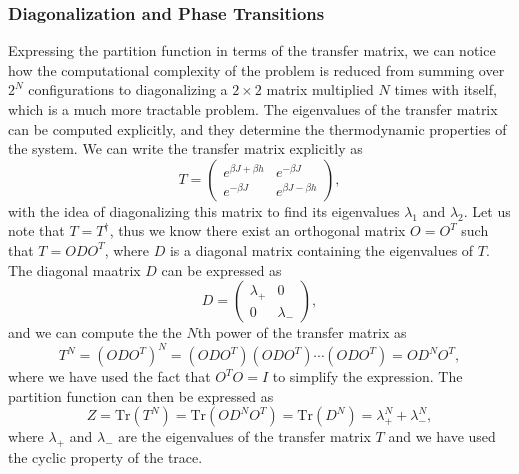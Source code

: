 \subsubsection{Diagonalization and Phase Transitions}

Expressing the partition function in terms of the transfer matrix, we can notice how the computational complexity of the problem is reduced from summing over \(2^N\) configurations to diagonalizing a \(2 \times 2\) matrix multiplied \(N\) times with itself, which is a much more tractable problem. The eigenvalues of the transfer matrix can be computed explicitly, and they determine the thermodynamic properties of the system. We can write the transfer matrix explicitly as
\[
    T = \begin{pmatrix}
        e^{\beta J + \beta h} & e^{-\beta J}          \\
        e^{-\beta J}          & e^{\beta J - \beta h}
    \end{pmatrix},
\]
with the idea of diagonalizing this matrix to find its eigenvalues \(\lambda_1\) and \(\lambda_2\). Let us note that \(T = T^{\dagger}\), thus we know there exist an orthogonal matrix \(O = O^T\) such that \(T = O D O^{T}\), where \(D\) is a diagonal matrix containing the eigenvalues of \(T\). The diagonal maatrix \(D\) can be expressed as
\[
    D = \begin{pmatrix}
        \lambda_+ & 0         \\
        0         & \lambda_-
    \end{pmatrix},
\]
and we can compute the the \(N\)th power of the transfer matrix as
\[
    T^N = (ODO^T)^N = (ODO^T)(ODO^T)\cdots(ODO^T) = O D^N O^T,
\]
where we have used the fact that \(O^T O = I\) to simplify the expression. The partition function can then be expressed as
\[
    Z = \text{Tr}(T^N) = \text{Tr}(O D^N O^T) = \text{Tr}(D^N) = \lambda_+^N + \lambda_-^N,
\]
where \(\lambda_+\) and \(\lambda_-\) are the eigenvalues of the transfer matrix \(T\) and we have used the cyclic property of the trace.

